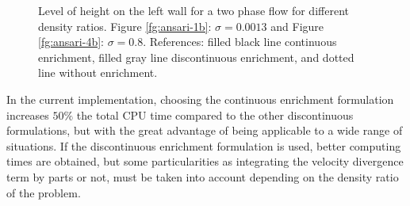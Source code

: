   \begin{figure}[h]
  \centering
   \caption{Level of height on the left wall for a two phase flow for different density ratios. Figure \ref{fg:ansari-1b}: $\sigma=0.0013$ and Figure \ref{fg:ansari-4b}: $\sigma=0.8$. References: filled black line continuous enrichment, filled gray line discontinuous enrichment, and dotted line without enrichment.}
   \label{fg:ansari-results-b}                %
\end{figure}

In the current implementation, choosing the continuous enrichment formulation increases $50\%$ the total CPU time compared to the other discontinuous formulations, but with the great advantage of being applicable to a wide range of situations. If the discontinuous enrichment formulation is used, better computing times are obtained, but some particularities as integrating the velocity divergence term by parts or not, must be taken into account depending on the density ratio of the problem.

\clearpage

